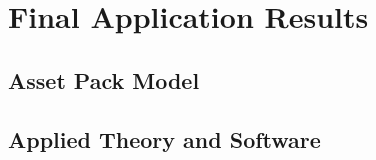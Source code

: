 \chapter{Final Application Results}\label{results}

\section{Asset Pack Model}\label{Asset Pack}

\section{Applied Theory and Software}\label{applied theory and software}